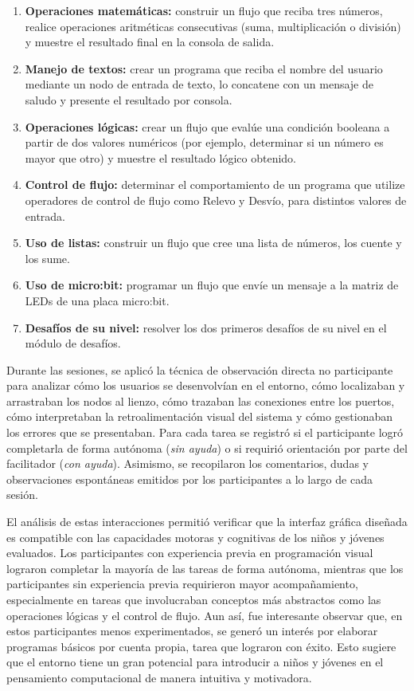 \begin{enumerate}
    \item \textbf{Operaciones matemáticas:} construir un flujo que reciba tres números, realice operaciones aritméticas consecutivas (suma, multiplicación o división) y muestre el resultado final en la consola de salida.
    \item \textbf{Manejo de textos:} crear un programa que reciba el nombre del usuario mediante un nodo de entrada de texto, lo concatene con un mensaje de saludo y presente el resultado por consola.
    \item \textbf{Operaciones lógicas:} crear un flujo que evalúe una condición booleana a partir de dos valores numéricos (por ejemplo, determinar si un número es mayor que otro) y muestre el resultado lógico obtenido.
    \item \textbf{Control de flujo:} determinar el comportamiento de un programa que utilize operadores de control de flujo como Relevo y Desvío, para distintos valores de entrada.
    \item \textbf{Uso de listas:} construir un flujo que cree una lista de números, los cuente y los sume.
    \item \textbf{Uso de micro:bit:} programar un flujo que envíe un mensaje a la matriz de LEDs de una placa micro:bit.
    \item \textbf{Desafíos de su nivel:} resolver los dos primeros desafíos de su nivel en el módulo de desafíos.
\end{enumerate}

Durante las sesiones, se aplicó la técnica de observación directa no participante para analizar cómo los usuarios se desenvolvían en el entorno, cómo localizaban y arrastraban los nodos al lienzo, cómo trazaban las conexiones entre los puertos, cómo interpretaban la retroalimentación visual del sistema y cómo gestionaban los errores que se presentaban. Para cada tarea se registró si el participante logró completarla de forma autónoma (\textit{sin ayuda}) o si requirió orientación por parte del facilitador (\textit{con ayuda}). Asimismo, se recopilaron los comentarios, dudas y observaciones espontáneas emitidos por los participantes a lo largo de cada sesión.

El análisis de estas interacciones permitió verificar que la interfaz gráfica diseñada es compatible con las capacidades motoras y cognitivas de los niños y jóvenes evaluados. Los participantes con experiencia previa en programación visual lograron completar la mayoría de las tareas de forma autónoma, mientras que los participantes sin experiencia previa requirieron mayor acompañamiento, especialmente en tareas que involucraban conceptos más abstractos como las operaciones lógicas y el control de flujo. Aun así, fue interesante observar que, en estos participantes menos experimentados, se generó un interés por elaborar programas básicos por cuenta propia, tarea que lograron con éxito. Esto sugiere que el entorno tiene un gran potencial para introducir a niños y jóvenes en el pensamiento computacional de manera intuitiva y motivadora.

